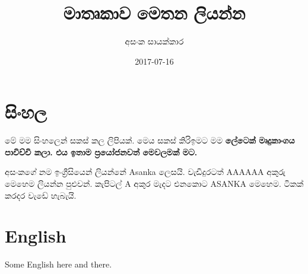\documentclass[12pt]{article}
\title{මාතෘකාව මෙතන ලියන්න}
\author{අසංක සායක්කාර}
\date{2017-07-16}
\begin{document}
\maketitle

\section{සිංහල}

මේ මම සිංහලෙන් සකස් කල ලිපියක්. මෙය සකස් කිරිඉමට මම \bf{ලේටෙක්} මෘදුකාංගය පාවිච්චි කලා. එය ඉතාම ප්‍රයෝජනවත් මෙවලමක් මට.

අසංකගේ නම ඉංග්‍රීසියෙන් ලියන්නේ Asanka ලෙසයි. 
වැඩිදුරටත් AAAAAA අකුරු මෙහෙම ලියන්න පුළුවන්.
කැපිටල් A අකුර මැදට එනකොට ASANKA මෙහෙම. ටිකක් කරදර වැඩේ හැබැයි.

\section{English}

Some English here and there.
\end{document}
